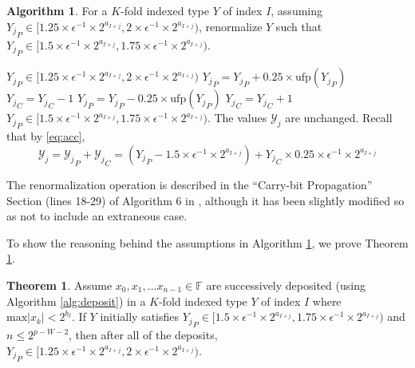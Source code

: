 \documentclass[12pt]{article}
\providecommand{\F}{\ensuremath{\mathbb{F}}}
\providecommand{\max}{\ensuremath{\text{max}}}
\providecommand{\ufp}{\ensuremath{\text{ufp}}}
\providecommand{\To}{\ensuremath{\text{ to }}}
\theoremstyle{definition}
\newtheorem{thm}{Theorem}[section]
\newtheorem{alg}{Algorithm}[section]
\numberwithin{equation}{section}
\numberwithin{figure}{section}
\begin{document}
    \begin{samepage}
    \begin{alg}
      For a $K$-fold indexed type $Y$ of index $I$, assuming ${Y_j}_P \in [1.25 \times \epsilon^{-1}\times 2^{a_{I + j}}, 2 \times \epsilon^{-1}\times 2^{a_{I + j}})$, renormalize $Y$ such that ${Y_j}_P \in [1.5 \times \epsilon^{-1}\times 2^{a_{I + j}}, 1.75 \times \epsilon^{-1}\times 2^{a_{I + j}})$.
      \begin{algorithmic}[1]
        \Require
          \Statex ${Y_j}_P \in [1.25 \times \epsilon^{-1}\times 2^{a_{I + j}}, 2 \times \epsilon^{-1}\times 2^{a_{I + j}})$
          \For{$j = 0 \To K - 1$}
            \If{${Y_j}_P < 1.5 \times \ufp({Y_j}_P)$}
              \State ${Y_j}_P = {Y_j}_P + 0.25 \times \ufp({Y_j}_P)$
              \State ${Y_j}_C = {Y_j}_C - 1$
            \EndIf
            \If{${Y_j}_P \geq 1.75 \times \ufp({Y_j}_P)$}
              \State ${Y_j}_P = {Y_j}_P - 0.25 \times \ufp({Y_j}_P)$
              \State ${Y_j}_C = {Y_j}_C + 1$
            \EndIf
          \EndFor
        \EndFunction
        \Ensure
          \Statex ${Y_j}_P \in [1.5 \times \epsilon^{-1}\times 2^{a_{I + j}}, 1.75 \times \epsilon^{-1}\times 2^{a_{I + j}})$.
          \Statex The values $\mathcal{Y}_j$ are unchanged. Recall that by \eqref{eq:acc},
          \begin{equation*}
            \mathcal{Y}_j = {\mathcal{Y}_j}_P + {\mathcal{Y}_j}_C = ({Y_j}_P - 1.5 \times\epsilon^{-1}\times 2^{a_{I + j}}) + {Y_j}_C \times 0.25\times\epsilon^{-1}\times2^{a_{I + j}}
          \end{equation*}
      \end{algorithmic}
      \label{alg:renorm}
    \end{alg}
    \end{samepage}
    The renormalization operation is described in the ``Carry-bit Propagation'' Section (lines 18-29) of Algorithm $6$ in \cite{repsum}, although it has been slightly modified so as not to include an extraneous case.

    To show the reasoning behind the assumptions in Algorithm \ref{alg:renorm}, we prove Theorem \ref{thm:renormfreq}.

      \begin{samepage}
    \begin{thm}
      Assume $x_0, x_1, ... x_{n - 1} \in \F$ are successively deposited (using Algorithm \ref{alg:deposit}) in a $K$-fold indexed type $Y$ of index $I$ where $\max|x_k| < 2^{b_I}$. If $Y$ initially satisfies ${Y_j}_P \in [1.5 \times \epsilon^{-1}\times 2^{a_{I + j}}, 1.75 \times \epsilon^{-1}\times 2^{a_{I + j}})$ and $n \leq 2^{p - W - 2}$, then after all of the deposits, ${Y_j}_P \in [1.25 \times \epsilon^{-1}\times 2^{a_{I + j}}, 2 \times \epsilon^{-1}\times 2^{a_{I + j}})$.
      \label{thm:renormfreq}
    \end{thm}
    \end{samepage}
\end{document}
